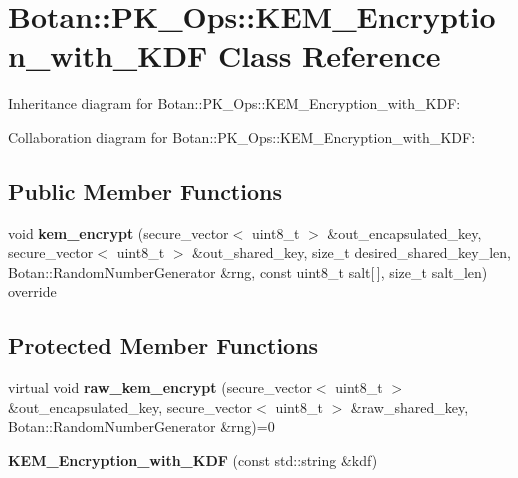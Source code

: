 \hypertarget{class_botan_1_1_p_k___ops_1_1_k_e_m___encryption__with___k_d_f}{}\section{Botan\+:\+:P\+K\+\_\+\+Ops\+:\+:K\+E\+M\+\_\+\+Encryption\+\_\+with\+\_\+\+K\+DF Class Reference}
\label{class_botan_1_1_p_k___ops_1_1_k_e_m___encryption__with___k_d_f}


Inheritance diagram for Botan\+:\+:P\+K\+\_\+\+Ops\+:\+:K\+E\+M\+\_\+\+Encryption\+\_\+with\+\_\+\+K\+DF\+:


Collaboration diagram for Botan\+:\+:P\+K\+\_\+\+Ops\+:\+:K\+E\+M\+\_\+\+Encryption\+\_\+with\+\_\+\+K\+DF\+:
\subsection*{Public Member Functions}
\begin{DoxyCompactItemize}
\item 
\mbox{\label{class_botan_1_1_p_k___ops_1_1_k_e_m___encryption__with___k_d_f_a5146c46f330b244d9a6811bf1f39e7f4}} 
void {\bfseries kem\+\_\+encrypt} (secure\+\_\+vector$<$ uint8\+\_\+t $>$ \&out\+\_\+encapsulated\+\_\+key, secure\+\_\+vector$<$ uint8\+\_\+t $>$ \&out\+\_\+shared\+\_\+key, size\+\_\+t desired\+\_\+shared\+\_\+key\+\_\+len, Botan\+::\+Random\+Number\+Generator \&rng, const uint8\+\_\+t salt\mbox{[}$\,$\mbox{]}, size\+\_\+t salt\+\_\+len) override
\end{DoxyCompactItemize}
\subsection*{Protected Member Functions}
\begin{DoxyCompactItemize}
\item 
\mbox{\label{class_botan_1_1_p_k___ops_1_1_k_e_m___encryption__with___k_d_f_a7a54ac3f229701d9217328d0f3019128}} 
virtual void {\bfseries raw\+\_\+kem\+\_\+encrypt} (secure\+\_\+vector$<$ uint8\+\_\+t $>$ \&out\+\_\+encapsulated\+\_\+key, secure\+\_\+vector$<$ uint8\+\_\+t $>$ \&raw\+\_\+shared\+\_\+key, Botan\+::\+Random\+Number\+Generator \&rng)=0
\item 
\mbox{\label{class_botan_1_1_p_k___ops_1_1_k_e_m___encryption__with___k_d_f_a68bff13bc399df0fb87a4b71b51e1d6e}} 
{\bfseries K\+E\+M\+\_\+\+Encryption\+\_\+with\+\_\+\+K\+DF} (const std\+::string \&kdf)
\end{DoxyCompactItemize}


